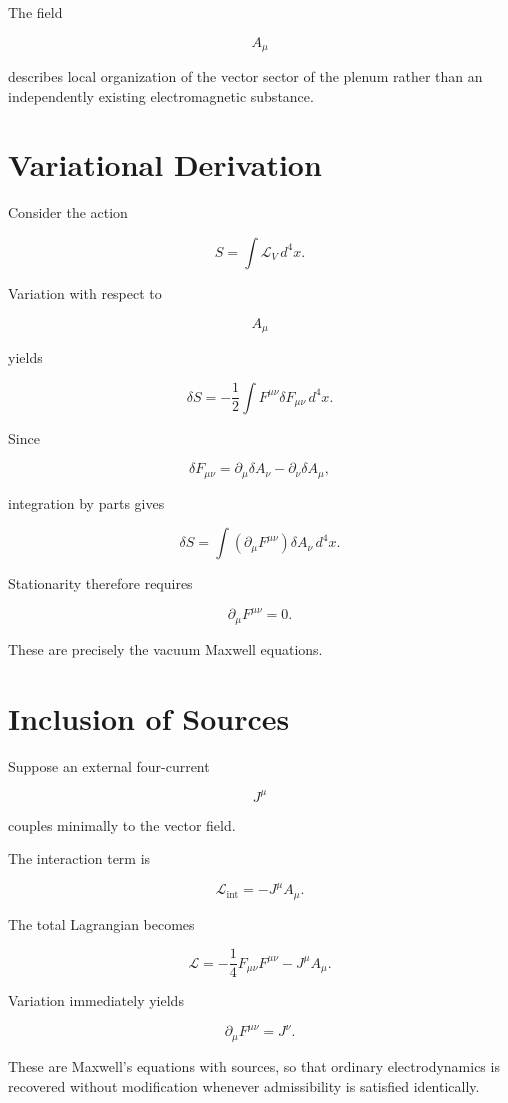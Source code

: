 \documentclass[11pt,oneside]{book}
\numberwithin{equation}{chapter}
\theoremstyle{definition}
\theoremstyle{plain}
\begin{document}
The field

\[
A_\mu
\]

describes local organization of the vector sector of the plenum rather than
an independently existing electromagnetic substance.

\section{Variational Derivation}

Consider the action

\[
S
=
\int
\mathcal L_V
\,d^4x.
\]

Variation with respect to

\[
A_\mu
\]

yields

\[
\delta S
=
-
\frac12
\int
F^{\mu\nu}
\delta F_{\mu\nu}
\,d^4x.
\]

Since

\[
\delta F_{\mu\nu}
=
\partial_\mu
\delta A_\nu
-
\partial_\nu
\delta A_\mu,
\]

integration by parts gives

\[
\delta S
=
\int
(\partial_\mu F^{\mu\nu})
\delta A_\nu
\,d^4x.
\]

Stationarity therefore requires

\[
\boxed{
\partial_\mu
F^{\mu\nu}
=
0.
}
\]

These are precisely the vacuum Maxwell equations.

\section{Inclusion of Sources}

Suppose an external four-current

\[
J^\mu
\]

couples minimally to the vector field.

The interaction term is

\[
\mathcal L_{\mathrm{int}}
=
-
J^\mu
A_\mu.
\]

The total Lagrangian becomes

\[
\mathcal L
=
-
\frac14
F_{\mu\nu}F^{\mu\nu}
-
J^\mu
A_\mu.
\]

Variation immediately yields

\[
\boxed{
\partial_\mu
F^{\mu\nu}
=
J^\nu.
}
\]

These are Maxwell's equations with sources, so that ordinary electrodynamics is recovered without modification whenever admissibility is satisfied identically.
\end{document}
